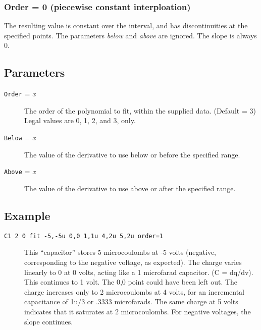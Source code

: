 \subsubsection{Order = 0 (piecewise constant interploation)}

The resulting value is constant over the interval, and has
discontinuities at the specified points.  The parameters {\em below}
and {\em above} are ignored.  The slope is always 0.
\subsection{Parameters}

\begin{description}
  
\item[{\tt Order} = {\it x}] The order of the polynomial to fit,
  within the supplied data.  (Default = 3) Legal values are 0, 1, 2,
  and 3, only.

\item[{\tt Below} = {\it x}] The value of the derivative to use
below or before the specified range.  

\item[{\tt Above} = {\it x}] The value of the derivative to use
above or after the specified range.

\end{description}
\subsection{Example} 

\begin{description}
  
\item[{\tt C1 2 0 fit -5,-5u 0,0 1,1u 4,2u 5,2u order=1}] This
  ``capacitor'' stores 5 microcoulombs at -5 volts (negative,
  corresponding to the negative voltage, as expected).  The charge
  varies linearly to 0 at 0 volts, acting like a 1 microfarad
  capacitor.  (C = dq/dv).  This continues to 1 volt.  The 0,0 point
  could have been left out.  The charge increases only to 2
  microcoulombs at 4 volts, for an incremental capacitance of 1u/3 or
  .3333 microfarads.  The same charge at 5 volts indicates that it
  saturates at 2 microcoulombs.  For negative voltages, the slope
  continues.

\end{description}
